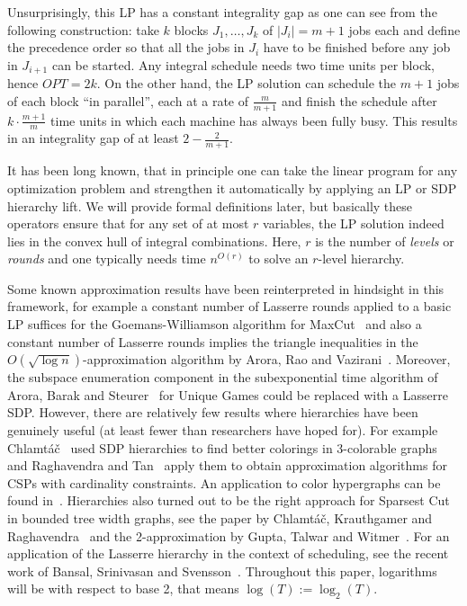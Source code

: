 \documentclass[11pt,letterpaper,oneside,english]{article}
\theoremstyle{theorem}
\begin{document}
Unsurprisingly, this LP has a constant integrality gap as one can see from the following construction: 
take $k$ blocks $J_1,\ldots,J_k$ of $|J_i| = m+1$ jobs each and define the precedence order so
that all the jobs in $J_i$ have to be finished before any job in $J_{i+1}$ can be started. 
Any integral schedule needs two time units per block, hence $OPT = 2k$. On the other hand, the LP
solution can schedule the $m+1$ jobs of each block ``in parallel'', each at a rate of $\frac{m}{m+1}$
and finish the schedule after $k \cdot \frac{m+1}{m}$ time units in which each machine has always
been fully busy. This results in an integrality gap of at least $2 - \frac{2}{m+1}$.

It has been long known, that in principle one can take the linear program for any optimization problem and 
strengthen it automatically by applying an LP or SDP hierarchy lift.
We will provide formal definitions later, but basically these operators ensure that for any
set of at most $r$ variables, the LP solution indeed lies in the convex hull of integral combinations.
Here, $r$ is the number of \emph{levels} or \emph{rounds} and one typically needs
time $n^{O(r)}$ to solve an $r$-level hierarchy.


Some known approximation results have been reinterpreted in hindsight in this framework, for 
example a constant number of Lasserre rounds applied to a basic LP suffices for the 
Goemans-Williamson algorithm for MaxCut~\cite{MaxCut-GoemansWilliamson-JACM95} and also a constant 
number of Lasserre rounds
implies the triangle inequalities in the $O(\sqrt{\log n})$-approximation algorithm by 
Arora, Rao and Vazirani~\cite{SparsestCut-AroraRaoVazirani-JACM09}. Moreover, the
subspace enumeration component in the subexponential time algorithm of Arora, Barak and
Steurer~\cite{UniqueGamesAlgo-AroraBarakSteurer-FOCS10} for Unique Games could be replaced with a Lasserre SDP.
However, there are relatively few results where hierarchies
have been genuinely useful (at least fewer than researchers have hoped for). 
For example Chlamt{\'a}{\v c}~\cite{ApproxAlgoViaSDP-Chlamtac-FOCS07}
used SDP hierarchies to find better colorings in 3-colorable graphs and Raghavendra and 
Tan~\cite{CSPs-with-card-constraints-RaghavendraTanSODA12} apply them to obtain approximation
algorithms for CSPs with cardinality constraints. An application to color
hypergraphs can be found in~\cite{HypergraphColoringChlamtacSinghAPPROX08}.
Hierarchies also turned out to be the
right approach for Sparsest Cut in bounded tree width graphs, see the paper by 
Chlamt{\'a}{\v c}, Krauthgamer and Raghavendra~\cite{SparsestCutInBoundedTreeWidthGraphs-CKR-APPROX2010} 
and the 2-approximation by Gupta, Talwar and Witmer~\cite{SparsestCut-GuptaTalwarWitmer-STOC2013}.
For an application of the Lasserre hierarchy in the context of scheduling, see the recent work 
of Bansal, Srinivasan and Svensson~\cite{LiftAndRound-BansalSrinivasanSvensson-STOC2016}.
Throughout this paper, logarithms will be with respect to base 2, that means $\log(T) := \log_2(T)$.
\end{document}
